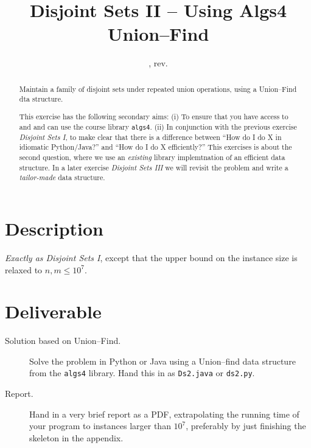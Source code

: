 \documentclass{tufte-handout}
\title{Disjoint Sets II -- Using Algs4 Union--Find}
\author{}
\date{\GITAuthorDate, rev. \GITAbrHash}
\begin{document}
\maketitle

\begin{abstract}
  Maintain a family of disjoint sets under repeated union operations, using a Union--Find dta structure.

  This exercise has the following secondary aims:
  (i) To ensure that you have access to and and can use the course library \texttt{algs4}.
  (ii) In conjunction with the previous exercise \emph{Disjoint Sets I}, to make clear that there is a difference between ``How do I do X in idiomatic Python/Java?'' and ``How do I do X efficiently?''
  This exercises is about the second question, where we use an \emph{existing} library implemtnation of an efficient data structure.
  In a later exercise \emph{Disjoint Sets III} we will revisit the problem and write a \emph{tailor-made} data structure.
\end{abstract}

\section{Description}

\emph{Exactly as Disjoint Sets I}, except that the upper bound on the instance size is relaxed to $n,m\leq 10^7$.

\section{Deliverable}

\begin{description}
  \item[Solution based on Union--Find.]
    Solve the problem in Python or Java using a Union--find data structure from the \texttt{algs4} library.
    Hand this in as \texttt{Ds2.java} or \texttt{ds2.py}.
  \item[Report.]
    Hand in a very brief report as a PDF, extrapolating the running time of your program to instances larger than $10^7$, preferably by just finishing the skeleton in the appendix. 
\end{description}
\end{document}
